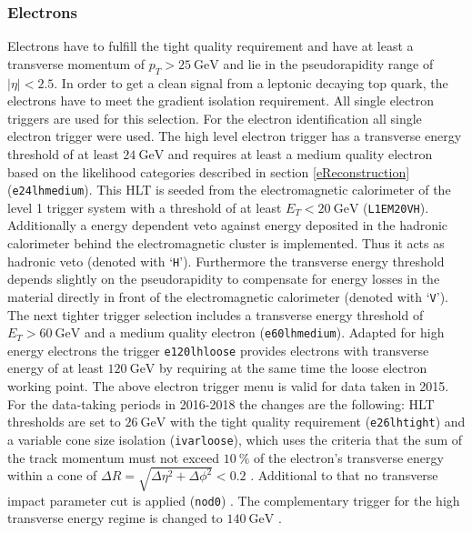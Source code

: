 \subsubsection*{Electrons}
Electrons have to fulfill the tight quality requirement and have at least a transverse momentum of $p_T>\SI{25}{\giga\electronvolt}$ and lie in the pseudorapidity range of $|\eta|<2.5$. In order to get a clean signal from a leptonic decaying top quark, the electrons have to meet the gradient isolation requirement. All single electron triggers are used for this selection.\newline
For the electron identification all single electron trigger were used. The high level electron trigger has a transverse energy threshold of at least $\SI{24}{\giga\electronvolt}$ and requires at least a medium quality electron based on the likelihood categories described in section \ref{eReconstruction} (\texttt{e24\textunderscore lhmedium}). This HLT is seeded from the electromagnetic calorimeter of the level 1 trigger system with a threshold of at least $E_T<\SI{20}{\giga\electronvolt}$ (\texttt{L1EM20VH}). Additionally a energy dependent veto against energy deposited in the hadronic calorimeter behind  the electromagnetic cluster is implemented. Thus it acts as hadronic veto (denoted with `\texttt{H}'). Furthermore the transverse energy threshold depends slightly on the pseudorapidity to compensate for energy losses in the material directly in front of the electromagnetic calorimeter (denoted with `\texttt{V}'). The next tighter trigger selection includes a transverse energy threshold of $E_T>\SI{60}{\giga\electronvolt}$ and a medium quality electron (\texttt{e60\textunderscore lhmedium}). Adapted for high energy electrons the trigger \texttt{e120\textunderscore lhloose} provides electrons with transverse energy of at least $\SI{120}{\giga\electronvolt}$ by requiring at the same time the loose electron working point. \cite{trigger:e:mu} The above electron trigger menu is valid for data taken in 2015. For the data-taking periods in 2016-2018 the changes are the following:\newline
HLT thresholds are set to $\SI{26}{\giga\electronvolt}$ with the tight quality requirement (\texttt{e26\textunderscore lhtight}) and a variable cone size isolation (\texttt{ivarloose}), which uses the criteria that the sum of the track momentum must not exceed $\SI{10}{\percent}$ of the electron's transverse energy within a cone of $\Delta R=\sqrt{\Delta\eta^2+\Delta\phi^2}<0.2$ \cite{trigger:ivarloose:erkl}\cite{trigger:ivarloose:form}. Additional to that no transverse impact parameter cut is applied (\texttt{nod0}) \cite{trigger:ivarloose:erkl}. The complementary trigger for the high transverse energy regime is changed to $\SI{140}{\giga\electronvolt}$ \cite{trigger:e:mu}.
